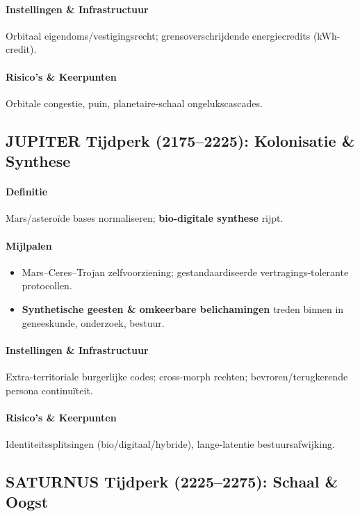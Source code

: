 \documentclass[11pt]{article}
\begin{document}
\paragraph{Instellingen \& Infrastructuur} Orbitaal eigendoms/vestigingsrecht; grensoverschrijdende energiecredits (kWh-credit).

\paragraph{Risico's \& Keerpunten} Orbitale congestie, puin, planetaire-schaal ongelukscascades.

\subsection{JUPITER Tijdperk (2175–2225): Kolonisatie \& Synthese}
\paragraph{Definitie} Mars/asteroïde bases normaliseren; \textbf{bio-digitale synthese} rijpt.

\paragraph{Mijlpalen}
\begin{itemize}[noitemsep]
  \item Mars–Ceres–Trojan zelfvoorziening; gestandaardiseerde vertragings-tolerante protocollen.
  \item \textbf{Synthetische geesten \& omkeerbare belichamingen} treden binnen in geneeskunde, onderzoek, bestuur.
\end{itemize}

\paragraph{Instellingen \& Infrastructuur} Extra-territoriale burgerlijke codes; cross-morph rechten; bevroren/terugkerende persona continuïteit.

\paragraph{Risico's \& Keerpunten} Identiteitssplitsingen (bio/digitaal/hybride), lange-latentie bestuursafwijking.

\subsection{SATURNUS Tijdperk (2225–2275): Schaal \& Oogst}
\end{document}
